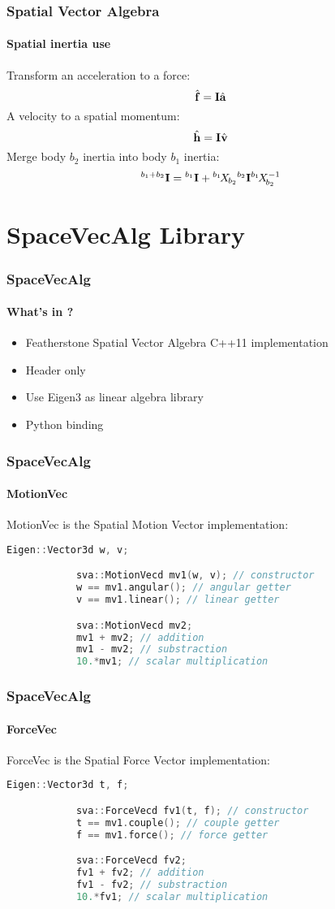 \documentclass{beamer}
\begin{document}
  	\begin{frame}
		\frametitle{Spatial Vector Algebra}
		\framesubtitle{Spatial inertia use}
		Transform an acceleration to a force:
		$$
		\forcevecHat = \inertia \accelvecHat
		$$
		A velocity to a spatial momentum:
		$$
		\momentumHat = \inertia \velocityvecHat
		$$
		Merge body $ b_2 $ inertia into body $ b_1 $ inertia:
		$$
		{}^{b_1+b_2}\inertia = {}^{b_1}\inertia + \transform{{b_2}}{{b_1}} {}^{b_2}\inertia\transformInv{{b_2}}{{b_1}}
		$$
	\end{frame}
	\section{SpaceVecAlg Library}

  	\begin{frame}
		\frametitle{SpaceVecAlg}
		\framesubtitle{What's in ?}
		\begin{itemize}
			\item Featherstone Spatial Vector Algebra C++11 implementation
			\item Header only
			\item Use Eigen3 as linear algebra library
			\item Python binding
		\end{itemize}
	\end{frame}


  	\begin{frame}[fragile]
		\frametitle{SpaceVecAlg}
		\framesubtitle{MotionVec}
		MotionVec is the Spatial Motion Vector implementation:
		\begin{lstlisting}[language=C++]
			Eigen::Vector3d w, v;

			sva::MotionVecd mv1(w, v); // constructor
			w == mv1.angular(); // angular getter
			v == mv1.linear(); // linear getter

			sva::MotionVecd mv2;
			mv1 + mv2; // addition
			mv1 - mv2; // substraction
			10.*mv1; // scalar multiplication
		\end{lstlisting}
	\end{frame}


  	\begin{frame}[fragile]
		\frametitle{SpaceVecAlg}
		\framesubtitle{ForceVec}
		ForceVec is the Spatial Force Vector implementation:
		\begin{lstlisting}[language=C++]
			Eigen::Vector3d t, f;

			sva::ForceVecd fv1(t, f); // constructor
			t == mv1.couple(); // couple getter
			f == mv1.force(); // force getter

			sva::ForceVecd fv2;
			fv1 + fv2; // addition
			fv1 - fv2; // substraction
			10.*fv1; // scalar multiplication
		\end{lstlisting}
	\end{frame}
\end{document}
